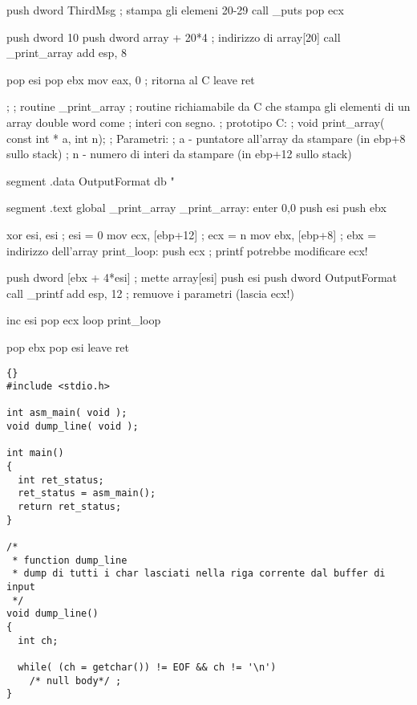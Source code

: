 \begin{AsmCodeListing}[label=array1.asm]
        push    dword ThirdMsg       ; stampa gli elemeni 20-29
        call    _puts
        pop     ecx

        push    dword 10
        push    dword array + 20*4     ; indirizzo di array[20]
        call    _print_array
        add     esp, 8

        pop     esi
        pop     ebx
        mov     eax, 0            ; ritorna al C
        leave                     
        ret

;
; routine _print_array
; routine richiamabile da C che stampa gli elementi di un array double word come
; interi con segno.
; prototipo C:
; void print_array( const int * a, int n);
; Parametri:
;   a - puntatore all'array da stampare (in ebp+8 sullo stack)
;   n - numero di interi da stampare  (in ebp+12 sullo stack)

segment .data
OutputFormat    db   "%

segment .text
        global  _print_array
_print_array:
        enter   0,0
        push    esi
        push    ebx

        xor     esi, esi                  ; esi = 0
        mov     ecx, [ebp+12]             ; ecx = n
        mov     ebx, [ebp+8]              ; ebx = indirizzo dell'array
print_loop:
        push    ecx                       ; printf potrebbe modificare ecx!

        push    dword [ebx + 4*esi]       ; mette array[esi]
        push    esi
        push    dword OutputFormat
        call    _printf
        add     esp, 12                   ; remuove i parametri (lascia ecx!)

        inc     esi
        pop     ecx
        loop    print_loop

        pop     ebx
        pop     esi
        leave
        ret
\end{AsmCodeListing}

\begin{lstlisting}{}
#include <stdio.h>

int asm_main( void );
void dump_line( void );

int main()
{
  int ret_status;
  ret_status = asm_main();
  return ret_status;
}

/*
 * function dump_line
 * dump di tutti i char lasciati nella riga corrente dal buffer di input
 */
void dump_line()
{
  int ch;

  while( (ch = getchar()) != EOF && ch != '\n')
    /* null body*/ ;
}
\end{lstlisting}

